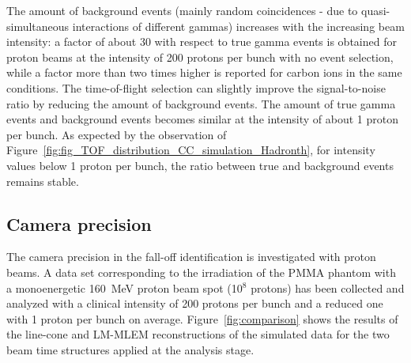The amount of background events (mainly random coincidences - due to quasi-simultaneous interactions of different gammas) increases with the increasing beam intensity: a factor of about 30 with respect to true gamma events is obtained for proton beams at  the intensity of 200 protons per bunch with no event selection, while a factor more than two times higher is reported for carbon ions in the same conditions. The time-of-flight selection can slightly improve the signal-to-noise ratio by reducing the amount of background events. The amount of true gamma events and background events becomes similar at the intensity of about 1 proton per bunch. As expected by the observation of Figure~\ref{fig:fig_TOF_distribution_CC_simulation_Hadronth}, for intensity values below 1 proton per bunch, the ratio between true and background events remains stable. 


\subsection{Camera precision}
\label{Results::precision_reconstruction}
The camera precision in the fall-off identification is investigated with proton beams.
A data set corresponding to the irradiation of the PMMA phantom with a monoenergetic 160~MeV proton beam spot (10$^8$ protons) has been collected and analyzed with a clinical intensity of 200 protons per bunch and a reduced one with 1 proton per bunch on average. 
Figure~\ref{fig:comparison} shows the results of the line-cone and LM-MLEM reconstructions of the simulated data for the two beam time structures applied at the analysis stage.  

